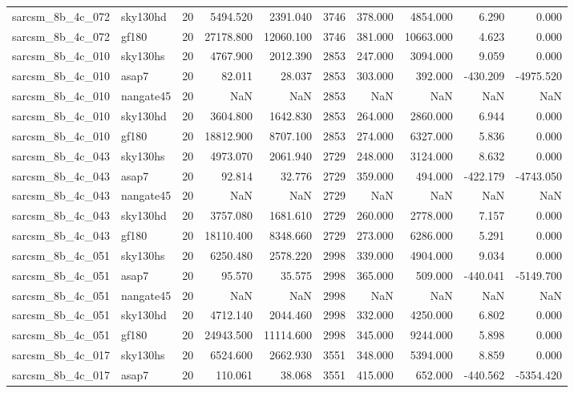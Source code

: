 \begin{longtable}{llrrrrrrrr}
sarcsm\_8b\_4c\_072 & sky130hd & 20 & 5494.520 & 2391.040 & 3746 & 378.000 & 4854.000 & 6.290 & 0.000 \\
sarcsm\_8b\_4c\_072 & gf180 & 20 & 27178.800 & 12060.100 & 3746 & 381.000 & 10663.000 & 4.623 & 0.000 \\
sarcsm\_8b\_4c\_010 & sky130hs & 20 & 4767.900 & 2012.390 & 2853 & 247.000 & 3094.000 & 9.059 & 0.000 \\
sarcsm\_8b\_4c\_010 & asap7 & 20 & 82.011 & 28.037 & 2853 & 303.000 & 392.000 & -430.209 & -4975.520 \\
sarcsm\_8b\_4c\_010 & nangate45 & 20 & NaN & NaN & 2853 & NaN & NaN & NaN & NaN \\
sarcsm\_8b\_4c\_010 & sky130hd & 20 & 3604.800 & 1642.830 & 2853 & 264.000 & 2860.000 & 6.944 & 0.000 \\
sarcsm\_8b\_4c\_010 & gf180 & 20 & 18812.900 & 8707.100 & 2853 & 274.000 & 6327.000 & 5.836 & 0.000 \\
sarcsm\_8b\_4c\_043 & sky130hs & 20 & 4973.070 & 2061.940 & 2729 & 248.000 & 3124.000 & 8.632 & 0.000 \\
sarcsm\_8b\_4c\_043 & asap7 & 20 & 92.814 & 32.776 & 2729 & 359.000 & 494.000 & -422.179 & -4743.050 \\
sarcsm\_8b\_4c\_043 & nangate45 & 20 & NaN & NaN & 2729 & NaN & NaN & NaN & NaN \\
sarcsm\_8b\_4c\_043 & sky130hd & 20 & 3757.080 & 1681.610 & 2729 & 260.000 & 2778.000 & 7.157 & 0.000 \\
sarcsm\_8b\_4c\_043 & gf180 & 20 & 18110.400 & 8348.660 & 2729 & 273.000 & 6286.000 & 5.291 & 0.000 \\
sarcsm\_8b\_4c\_051 & sky130hs & 20 & 6250.480 & 2578.220 & 2998 & 339.000 & 4904.000 & 9.034 & 0.000 \\
sarcsm\_8b\_4c\_051 & asap7 & 20 & 95.570 & 35.575 & 2998 & 365.000 & 509.000 & -440.041 & -5149.700 \\
sarcsm\_8b\_4c\_051 & nangate45 & 20 & NaN & NaN & 2998 & NaN & NaN & NaN & NaN \\
sarcsm\_8b\_4c\_051 & sky130hd & 20 & 4712.140 & 2044.460 & 2998 & 332.000 & 4250.000 & 6.802 & 0.000 \\
sarcsm\_8b\_4c\_051 & gf180 & 20 & 24943.500 & 11114.600 & 2998 & 345.000 & 9244.000 & 5.898 & 0.000 \\
sarcsm\_8b\_4c\_017 & sky130hs & 20 & 6524.600 & 2662.930 & 3551 & 348.000 & 5394.000 & 8.859 & 0.000 \\
sarcsm\_8b\_4c\_017 & asap7 & 20 & 110.061 & 38.068 & 3551 & 415.000 & 652.000 & -440.562 & -5354.420 \\

\end{longtable}
